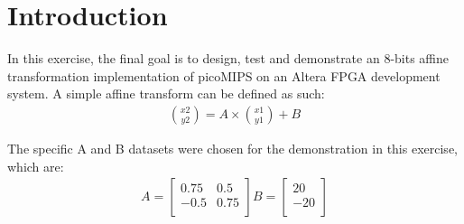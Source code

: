 
\section{Introduction} \label{Section:Introduction}
In this exercise, the final goal is to design, test and demonstrate an 8-bits affine transformation implementation of picoMIPS on an Altera FPGA development system. A simple affine transform\cite{affine} can be defined as such: 
\begin{align}
	{x2 \choose y2} = A \times {x1 \choose y1} + B
\end{align}

The specific A and B datasets were chosen for the demonstration in this exercise, which are:
\begin{align}
 A = \begin{bmatrix}
       0.75 & 0.5           \\[0.3em]
       -0.5 & 0.75          \\[0.3em]
     \end{bmatrix}   		
 B= \begin{bmatrix}
        20          \\[0.3em]
       -20          \\[0.3em]
     \end{bmatrix}
\end{align}

